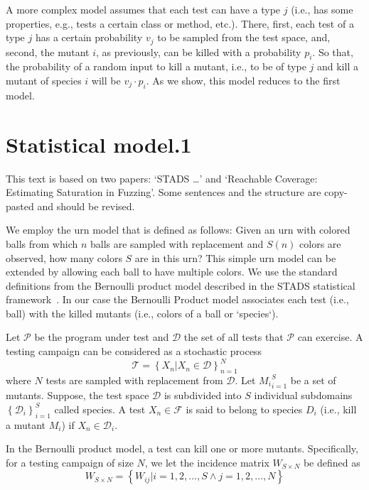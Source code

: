 \documentclass[conference]{IEEEtran}
\begin{document}
A more complex model assumes that each test can have a type $j$ (i.e., has some properties, e.g., tests a certain class or method, etc.). There, first, each test of a type $j$ has a certain probability $v_j$ to be sampled from the test space, and, second, the mutant $i$, as previously, can be killed with a probability $p_i$.
So that, the probability of a random input to kill a mutant, i.e., to be of type $j$ and kill a mutant of species $i$ will be $v_j\cdot p_i$.
As we show, this model reduces to the first model.

\section{Statistical model.1}
\label{sec:urn}
\begin{tcolorbox}[boxrule=0.5pt, arc=4pt, boxsep=0pt, width=\columnwidth]
This text is based on two papers: `STADS \ldots' and `Reachable Coverage: Estimating Saturation in Fuzzing'.
Some sentences and the structure are copy-pasted and should be revised.
\end{tcolorbox}

We employ the urn model that is defined as follows:
Given an urn with colored balls from which $n$ balls are sampled with replacement and $S(n)$ colors are observed, how many colors $S$ are in this urn?
This simple urn model can be extended by allowing each ball to have multiple colors.
We use the standard definitions from the Bernoulli product model described in the STADS statistical framework~\cite{bohme2018stads}.
In our case the Bernoulli Product model associates each test (i.e., ball) with the killed mutants (i.e., colors of a ball or `species`).

Let $\mathcal{P}$ be the program under test and $\mathcal{D}$ the set of all tests that $\mathcal{P}$ can exercise.
A testing campaign can be considered as a stochastic process
\[
    \mathcal{T}=\left\{ X_n|X_n \in \mathcal{D} \right\}_{n=1}^N
\]
where $N$ tests are sampled with replacement from $\mathcal{D}$.
Let ${M_i}_{i=1}^S$ be a set of mutants.
Suppose, the test space $\mathcal{D}$ is subdivided into $S$ individual subdomains $\left\{\mathcal{D}_i\right\}_{i=1}^S$
called species.
A test $X_n \in \mathcal{F}$ is said to belong to species $D_i$ (i.e., kill a mutant $M_i$) if $X_n \in \mathcal{D}_i$.

In the Bernoulli product model, a test can kill one or more mutants.
Specifically, for a testing campaign of size $N$, we let the incidence matrix $W_{S\times N}$ be defined as
\[
W_{S\times N} = \left\{W_{ij} |i=1,2,\dots,S\land j=1,2,\dots,N \right\}
\]
\end{document}

